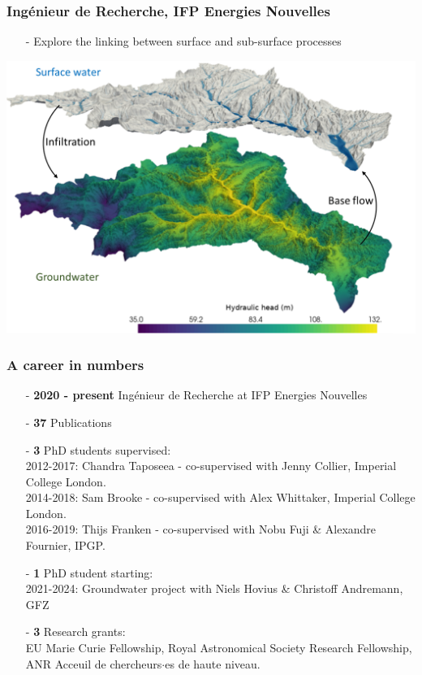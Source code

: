 \documentclass[aspectratio=169]{beamer}
\begin{document}
\begin{frame}
    \frametitle{Ing{\'e}nieur de Recherche, IFP Energies Nouvelles}
    \begin{itemize}
        \item[-]{Explore the linking between surface and sub-surface processes}
    \end{itemize}
    \centering
    \includegraphics[width=0.6\paperwidth]{./pictures/graphic1.png}
\end{frame}

\begin{frame}
    \frametitle{A career in numbers}
    \begin{itemize}
        \item[-]{{\bf 2020 - present} Ing{\'e}nieur de Recherche at IFP Energies Nouvelles}
        \item[-]{{\bf37} Publications}
        \item[-]{{\bf3} PhD students supervised: \\
              2012-2017: Chandra Taposeea - co-supervised with Jenny Collier, Imperial College London. \\
              2014-2018: Sam Brooke - co-supervised with Alex Whittaker, Imperial College London. \\
              2016-2019: Thijs Franken - co-supervised with Nobu Fuji \& Alexandre Fournier, IPGP.}
        \item[-]{{\bf1} PhD student starting: \\
              2021-2024: Groundwater project with Niels Hovius \& Christoff Andremann, GFZ}
        \item[-]{{\bf3} Research grants: \\
              EU Marie Curie Fellowship, Royal Astronomical Society Research Fellowship, ANR Acceuil de chercheurs$\cdot$es de haute niveau.}
    \end{itemize}
\end{frame}
\end{document}
